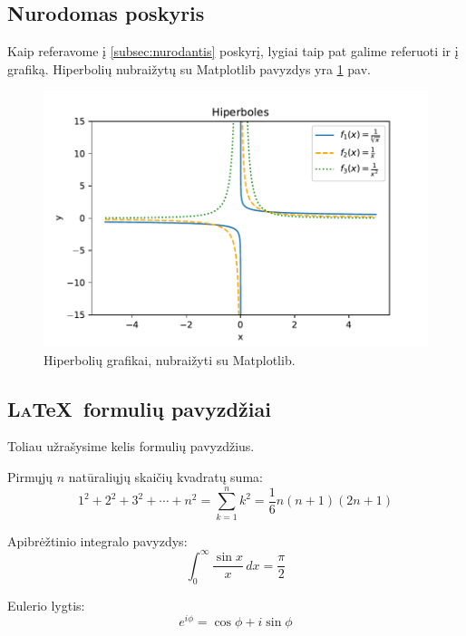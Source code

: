 \documentclass{article}
\begin{document}
\subsection{Nurodomas poskyris} 
\label{subsec:nurodomas}  %
Kaip referavome į \ref{subsec:nurodantis} poskyrį, lygiai taip pat galime referuoti ir į grafiką. Hiperbolių nubraižytų su Matplotlib pavyzdys yra \ref{fig:hiperbole} pav.

\begin{figure}[h!]
    \raggedright
    \includegraphics[width=\textwidth]{funk.pdf}
    \caption{Hiperbolių grafikai, nubraižyti su Matplotlib.}
    \label{fig:hiperbole}
\end{figure}

\pagebreak
\subsection{L\textsc{a}\TeX\ formulių pavyzdžiai}
Toliau užrašysime kelis formulių pavyzdžius.

Pirmųjų \( n \) natūraliųjų skaičių kvadratų suma:
\begin{equation}
    1^2 + 2^2 + 3^2 + \cdots + n^2 = \sum_{k=1}^{n} k^2 = \frac{1}{6} n (n+1)(2n+1)
    \label{eq:squaresum}
\end{equation}

Apibrėžtinio integralo pavyzdys:
\begin{equation}
    \int_{0}^{\infty} \frac{\sin x}{x} \, dx = \frac{\pi}{2}
    \label{eq:integral1}
\end{equation}

Eulerio lygtis:
\begin{equation}
    e^{i\phi} = \cos \phi + i \sin \phi
    \label{eq:euler2}
\end{equation}
\end{document}
